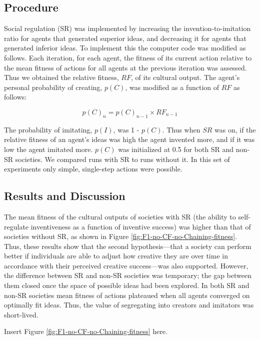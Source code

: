 \documentclass[a4paper,12pt,man,british]{apa6}
\begin{document}
\subsection{Procedure}
Social regulation (SR) was implemented by increasing the invention-to-imitation ratio for agents that generated superior ideas, and decreasing it for agents that generated inferior ideas. To implement
this the computer code was modified as follows. Each iteration, for each agent, the fitness of its current action relative to the mean fitness of actions for all agents at the previous iteration was assessed. Thus we obtained the relative fitness, $RF$, of its cultural output. The agent's personal probability of creating, $p(C)$, was modified as a function of $RF$ as follows:

\begin{equation}
	p(C)_{n} = p(C)_{n-1} \times RF_{n-1}
\label{eq:socialregulation}
\end{equation}
 
The probability of imitating, $p(I)$, was 1 - $p(C)$. Thus when $SR$ was on, if the relative fitness of an agent's ideas was high the agent invented more, and if it was low the agent imitated more. $p(C)$ was initialized at 0.5 for both SR and non-SR societies. We compared runs with SR to runs without it. In this set of experiments only simple, single-step actions were possible. 

\subsection{Results and Discussion}
The mean fitness of the cultural outputs of societies with SR (the ability to self-regulate inventiveness as a function of inventive success) was higher than that of societies without SR, as shown in Figure \ref{fig:F1-no-CF-no-Chaining-fitness}. Thus, these results show that the second hypothesis---that a society can perform better if individuals are able to adjust how creative they are over time in accordance with their perceived creative success---was also supported. However, the difference between SR and non-SR societies was temporary; the gap between them closed once the space of possible ideas had been explored. In both SR and non-SR societies mean fitness of actions plateaued when all agents converged on optimally fit ideas. Thus, the value of segregating into creators and imitators was short-lived.

\begin{center} %
Insert Figure \ref{fig:F1-no-CF-no-Chaining-fitness} here.
\end{center}
\end{document}
